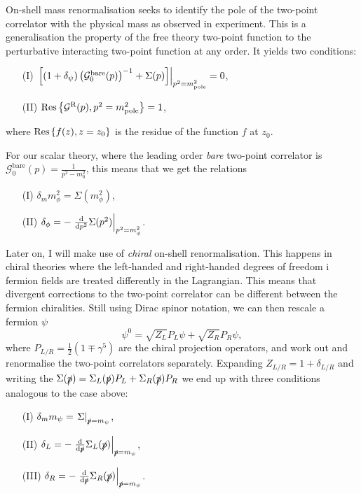 \documentclass[../main.tex]{subfiles}
\begin{document}
On-shell mass renormalisation seeks to identify the pole of the two-point correlator with the physical mass as observed in experiment.
This is a generalisation the property of the free theory two-point function to the perturbative interacting two-point function at any order.
It yields two conditions:
\begin{center}
  \begin{itemize}
    \item [(I)] \(\evalat{\bclosed{(1+\delta_\psi)\pclosed{\mathcal{G}^\text{bare}_0(p)}^{-1}
              + \Sigma(p)}}{p^2 = m_\text{pole}^2} = 0\),
    \item [(II)] \(\operatorname{Res}\cclosed{\mathcal{G}^\text{R}(p), p^2
            = m_\text{pole}^2} = 1\),
  \end{itemize}
\end{center}
where \(\operatorname{Res}\cclosed{f(z), z = z_0}\) is the residue of the
function \(f\) at \(z_0\).
\medskip

For our scalar theory, where the leading order \emph{bare} two-point correlator is
\(\mathcal{G}_0^\text{bare}(p) =\frac{1}{p^2 - m_0^2}\), this means that we get the
relations
\begin{center}
  \begin{itemize}
    \item [(I)] \(\delta_m m_\phi^2 = \Sigma(m_\phi^2)\),
    \item [(II)] \(\delta_\phi = -\evalat{\d[p^2]{}\Sigma(p^2)}{p^2 =
            m_\phi^2}\).
  \end{itemize}
\end{center}
\medskip

Later on, I will make use of \emph{chiral} on-shell renormalisation.
This happens in chiral theories where the left-handed and right-handed degrees of freedom i fermion fields are treated differently in the Lagrangian.
This means that divergent corrections to the two-point correlator can be different between the fermion chiralities.
Still using Dirac spinor notation, we can then rescale a fermion \(\psi\)
\begin{equation}
  \psi^0 = \sqrt{Z_L} P_L \psi + \sqrt{Z_R} P_R \psi,
\end{equation}
where \(P_{L/R} = \frac{1}{2}(1 \mp \gamma^5)\) are the chiral projection operators, and work out and renormalise the two-point correlators separately.
Expanding \(Z_{L/R} = 1 + \delta_{L/R}\) and writing the \(\Sigma(\slashed{p}) = \Sigma_L(\slashed{p})P_L + \Sigma_R(\slashed{p})P_R\) we end up with three conditions analogous to the case above:
\begin{center}
  \begin{itemize}
    \item [(I)] \(\delta_m m_\psi = \evalat{\Sigma}{\slashed{p}=m_\psi}\),
    \item [(II)] \(\delta_L = -\evalat{\d[\slashed{p}]{}\Sigma_L(\slashed{p})}{\slashed{p} = m_\psi}\),
    \item [(III)] \(\delta_R = -\evalat{\d[\slashed{p}]{}\Sigma_R(\slashed{p})}{\slashed{p} = m_\psi}\).
  \end{itemize}
\end{center}
\end{document}
